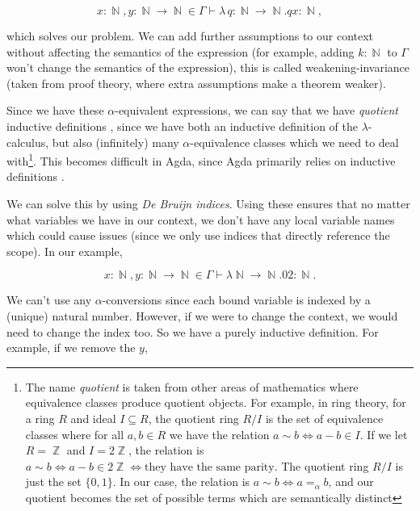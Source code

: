 \documentclass[logo,bsc,singlespacing,parskip,online]{infthesis}
\DeclareMathOperator{\nat}{\mathbb{N}}
\DeclareMathOperator{\integer}{\mathbb{Z}}
\begin{document}
\begin{equation*}
  x \colon \nat, y \colon \nat \to \nat \in \Gamma \vdash \lambda \, q \colon \nat \to \nat. q x \colon \nat,
\end{equation*}

which solves our problem. We can add further assumptions to our context without
affecting the semantics of the expression (for example, adding $k \colon \nat$
to $\Gamma$ won't change the semantics of the expression), this is called
weakening-invariance (taken from proof theory, where extra assumptions make a
theorem weaker).

Since we have these $\alpha$-equivalent expressions, we can say that we have
\textit{quotient} inductive definitions \citep{aydemir_engineering_2008}, since
we have both an inductive definition of the $\lambda$-calculus, but also
(infinitely) many $\alpha$-equivalence classes which we need to deal
with\footnote{The name \textit{quotient} is taken from other areas of
mathematics where equivalence classes produce quotient objects. For example, in
ring theory, for a ring $R$ and ideal $I \subseteq R$, the quotient ring $R/I$
is the set of equivalence classes where for all $a, b \in R$ we have the
relation $a \sim b \iff a - b \in I$. If we let $R = \integer$ and $I =
2\integer$, the relation is $a \sim b \iff a - b \in 2\integer \iff \text{they
have the same parity}$. The quotient ring $R/I$ is just the set $\{0, 1\}$. In
our case, the relation is $a \sim b \iff a =_{\alpha} b$, and our quotient
becomes the set of possible terms which are semantically distinct}. This becomes
difficult in Agda, since Agda primarily relies on inductive definitions
\citep{pitts_locally_2023}.

We can solve this by using \textit{De Bruijn indices}. Using these ensures that
no matter what variables we have in our context, we don't have any local
variable names which could cause issues (since we only use indices that directly
reference the scope). In our example,

\begin{equation*}
  x \colon \nat, y \colon \nat \to \nat \in \Gamma \vdash \lambda \nat \to \nat. 0 2 \colon \nat.
\end{equation*}

We can't use any $\alpha$-conversions since each bound variable is indexed by a
(unique) natural number. However, if we were to change the context, we would
need to change the index too. So we have a purely inductive definition. For
example, if we remove the $y$,
\end{document}
